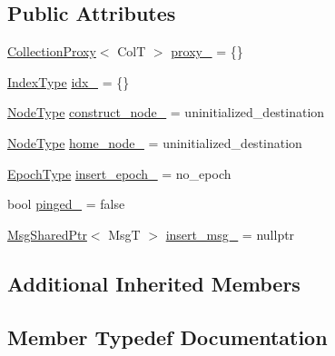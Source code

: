 \subsection*{Public Attributes}
\begin{DoxyCompactItemize}
\item 
\hyperlink{structvt_1_1vrt_1_1collection_1_1_collection_proxy}{Collection\+Proxy}$<$ ColT $>$ \hyperlink{structvt_1_1vrt_1_1collection_1_1_insert_msg_aafebebf63eb0e3b61f1b800a9663065e}{proxy\+\_\+} = \{\}
\item 
\hyperlink{structvt_1_1vrt_1_1collection_1_1_insert_msg_a6d0f0e849ba09859a0cda3e4785de16b}{Index\+Type} \hyperlink{structvt_1_1vrt_1_1collection_1_1_insert_msg_aa694e0805d2e5b253d18c9430fa74ae5}{idx\+\_\+} = \{\}
\item 
\hyperlink{namespacevt_a866da9d0efc19c0a1ce79e9e492f47e2}{Node\+Type} \hyperlink{structvt_1_1vrt_1_1collection_1_1_insert_msg_a0e6be53d3c93e511f44d5a62fdf7a4e2}{construct\+\_\+node\+\_\+} = uninitialized\+\_\+destination
\item 
\hyperlink{namespacevt_a866da9d0efc19c0a1ce79e9e492f47e2}{Node\+Type} \hyperlink{structvt_1_1vrt_1_1collection_1_1_insert_msg_a8ce98733c640a3fdfe5a1870f6945040}{home\+\_\+node\+\_\+} = uninitialized\+\_\+destination
\item 
\hyperlink{namespacevt_a985a5adf291c34a3ca263b3378388236}{Epoch\+Type} \hyperlink{structvt_1_1vrt_1_1collection_1_1_insert_msg_ab00f3ff128fbe31ab7e7163248b2ac15}{insert\+\_\+epoch\+\_\+} = no\+\_\+epoch
\item 
bool \hyperlink{structvt_1_1vrt_1_1collection_1_1_insert_msg_a9b0a68bf8f23b5d377581e1e55ba5a50}{pinged\+\_\+} = false
\item 
\hyperlink{namespacevt_ab2b3d506ec8e8d1540aede826d84a239}{Msg\+Shared\+Ptr}$<$ MsgT $>$ \hyperlink{structvt_1_1vrt_1_1collection_1_1_insert_msg_aed7412452e22de28daa6cc73a4a0acef}{insert\+\_\+msg\+\_\+} = nullptr
\end{DoxyCompactItemize}
\subsection*{Additional Inherited Members}


\subsection{Member Typedef Documentation}
\mbox{\label{structvt_1_1vrt_1_1collection_1_1_insert_msg_a6d0f0e849ba09859a0cda3e4785de16b}} 
